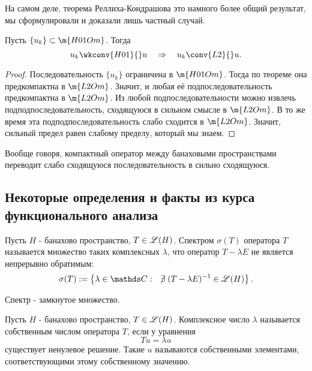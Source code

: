 \begin{note}
На самом деле, теорема Реллиха-Кондрашова это намного более общий результат, мы сформулировали и доказали лишь частный случай. 
\end{note}

\begin{corollary} Пусть $\{ u_k \} \subset \m{H01Om}$. Тогда
$$ u_k \wkconv{H01}{} u \quad \Rightarrow \quad u_k \conv{L2}{} u.$$
\end{corollary}
\begin{proof}
Последовательность $\{ u_k \}$ ограничена в $\m{H01Om}$. Тогда по теореме она предкомпактна в $\m{L2Om}$. Значит, и любая её подпоследовательность предкомпактна в $\m{L2Om}$. Из любой подпоследовательности можно извлечь подподпоследовательность, сходящуюся в сильном смысле в $\m{L2Om}$. В то же время эта подподпоследовательность слабо сходится в $\m{L2Om}$. Значит, сильный предел равен слабому пределу, который мы знаем.

\end{proof}

\begin{note} Вообще говоря, компактный оператор между банаховыми пространствами переводит слабо сходящуюся последовательность в сильно сходящуюся.
\end{note}

\subsection*{Некоторые определения и факты из курса функционального анализа}

\begin{definition} Пусть $H$ - банахово пространство, $T \in \mathscr{L}(H)$. Спектром $\sigma (T)$ оператора $T$ называется множество таких комплексных $\lambda$, что оператор $T - \lambda E$ не является непрерывно обратимым:
$$ \sigma(T) := \left\{ \lambda \in \complex : \quad \centernot\exists (T - \lambda E)^{-1} \in \linop(H) \right\}.$$
\end{definition}

\begin{note}
Спектр - замкнутое множество.
\end{note}

\begin{definition} Пусть $H$ - банахово пространство, $T \in \mathscr{L}(H)$. Комплексное число $\lambda$ называется собственным числом оператора $T$, если у уравнения
$$ Tu = \lambda u$$
существует ненулевое решение. Такие $u$ называются собственными элементами, соответствующими этому собственному значению.
\end{definition}

